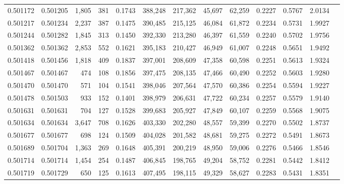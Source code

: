 \begin{tabular}{rrrrrrrrrrrrr}
0.501172 & 0.501205 & 1,805 &   381 &                                     0.1743 & 388,248 & 217,362 &  45,697 &  62,259 & 0.2227 & 0.5767 & 2.0134 \\
0.501217 & 0.501234 & 2,237 &   387 &                                     0.1475 & 390,485 & 215,125 &  46,084 &  61,872 & 0.2234 & 0.5731 & 1.9927 \\
0.501244 & 0.501282 & 1,845 &   313 &                                     0.1450 & 392,330 & 213,280 &  46,397 &  61,559 & 0.2240 & 0.5702 & 1.9756 \\
0.501362 & 0.501362 & 2,853 &   552 &                                     0.1621 & 395,183 & 210,427 &  46,949 &  61,007 & 0.2248 & 0.5651 & 1.9492 \\
0.501418 & 0.501456 & 1,818 &   409 &                                     0.1837 & 397,001 & 208,609 &  47,358 &  60,598 & 0.2251 & 0.5613 & 1.9324 \\
0.501467 & 0.501467 &   474 &   108 &                                     0.1856 & 397,475 & 208,135 &  47,466 &  60,490 & 0.2252 & 0.5603 & 1.9280 \\
0.501470 & 0.501470 &   571 &   104 &                                     0.1541 & 398,046 & 207,564 &  47,570 &  60,386 & 0.2254 & 0.5594 & 1.9227 \\
0.501478 & 0.501503 &   933 &   152 &                                     0.1401 & 398,979 & 206,631 &  47,722 &  60,234 & 0.2257 & 0.5579 & 1.9140 \\
0.501631 & 0.501631 &   704 &   127 &                                     0.1528 & 399,683 & 205,927 &  47,849 &  60,107 & 0.2259 & 0.5568 & 1.9075 \\
0.501634 & 0.501634 & 3,647 &   708 &                                     0.1626 & 403,330 & 202,280 &  48,557 &  59,399 & 0.2270 & 0.5502 & 1.8737 \\
0.501677 & 0.501677 &   698 &   124 &                                     0.1509 & 404,028 & 201,582 &  48,681 &  59,275 & 0.2272 & 0.5491 & 1.8673 \\
0.501689 & 0.501704 & 1,363 &   269 &                                     0.1648 & 405,391 & 200,219 &  48,950 &  59,006 & 0.2276 & 0.5466 & 1.8546 \\
0.501714 & 0.501714 & 1,454 &   254 &                                     0.1487 & 406,845 & 198,765 &  49,204 &  58,752 & 0.2281 & 0.5442 & 1.8412 \\
0.501719 & 0.501729 &   650 &   125 &                                     0.1613 & 407,495 & 198,115 &  49,329 &  58,627 & 0.2283 & 0.5431 & 1.8351 \\

\end{tabular}
